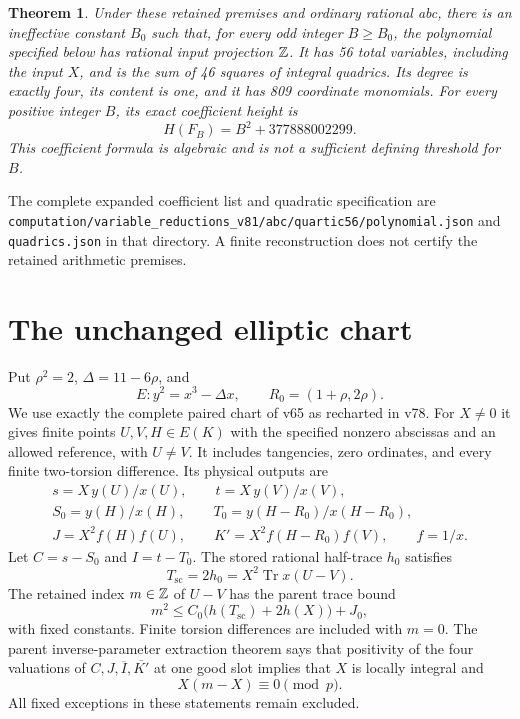 \documentclass[11pt,a4paper]{article}
\newtheorem{theorem}{Theorem}[section]
\DeclareMathOperator{\Tr}{Tr}\DeclareMathOperator{\Nm}{Nm}
\begin{document}
\begin{theorem}\label{thm:main}
Under these retained premises and ordinary rational abc, there is an
ineffective constant $B_0$ such that, for every odd integer $B\ge B_0$,
the polynomial specified below has rational input projection $\mathbb Z$.
It has 56 total variables, including the input $X$, and is the sum of
46 squares of integral quadrics. Its degree is exactly four, its content
is one, and it has 809 coordinate monomials. For every positive integer
$B$, its exact coefficient height is
\[
 H(F_B)=B^2+377888002299.
\]
This coefficient formula is algebraic and is not a sufficient defining
threshold for $B$.
\end{theorem}

The complete expanded coefficient list and quadratic specification are
\nolinkurl{computation/variable_reductions_v81/abc/quartic56/polynomial.json}
and \nolinkurl{quadrics.json} in that directory. A finite reconstruction
does not certify the retained arithmetic premises.

\section{The unchanged elliptic chart}

Put $\rho^2=2$, $\Delta=11-6\rho$, and
\[
 E:y^2=x^3-\Delta x,\qquad R_0=(1+\rho,2\rho).
\]
We use exactly the complete paired chart of v65 as recharted in
v78. For $X\ne0$ it gives finite points $U,V,H\in E(K)$ with the
specified nonzero abscissas and an allowed reference, with $U\ne V$.
It includes tangencies, zero ordinates, and every finite two-torsion
difference. Its physical outputs are
\[
\begin{gathered}
 s=X\,y(U)/x(U),\qquad t=X\,y(V)/x(V),\\
 S_0=y(H)/x(H),\qquad T_0=y(H-R_0)/x(H-R_0),\\
 J=X^2f(H)f(U),\qquad K'=X^2f(H-R_0)f(V),\qquad f=1/x.
\end{gathered}
\]
Let $C=s-S_0$ and $I=t-T_0$. The stored rational half-trace $h_0$ satisfies
\[
 T_{\mathrm{sc}}=2h_0=X^2\Tr x(U-V).
\]
The retained index $m\in\mathbb Z$ of $U-V$ has the parent trace bound
\begin{equation}\label{eq:index}
 m^2\le C_0\bigl(h(T_{\mathrm{sc}})+2h(X)\bigr)+J_0,
\end{equation}
with fixed constants. Finite torsion differences are included with
$m=0$. The parent inverse-parameter extraction theorem says that
positivity of the four valuations of $C,J,\overline I,\overline{K'}$
at one good slot implies that $X$ is locally integral and
\begin{equation}\label{eq:local-label}
                         X(m-X)\equiv0\pmod p.
\end{equation}
All fixed exceptions in these statements remain excluded.
\end{document}
